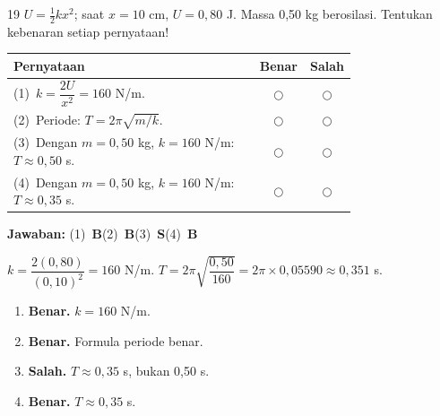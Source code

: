 \documentclass[11pt]{article}
\newcommand{\jawaban}[1]{%
  \noindent\colorbox{gold!30}{\parbox{\dimexpr\linewidth-2\fboxsep\relax}{%
    \textbf{Jawaban:} #1}}\par\smallskip}
\begin{document}
\begin{soal}{19}
$U=\tfrac12kx^2$; saat $x=10$ cm, $U=0{,}80$ J. Massa 0{,}50 kg berosilasi.
Tentukan kebenaran setiap pernyataan!

\par\smallskip
{\renewcommand{\arraystretch}{1.4}%
\begin{tabular}{@{}p{0.76\linewidth}cc@{}}
\hline\textbf{Pernyataan}&\textbf{Benar}&\textbf{Salah}\\\hline
(1)~$k=\dfrac{2U}{x^2}=160$ N/m.&$\bigcirc$&$\bigcirc$\\
(2)~Periode: $T=2\pi\sqrt{m/k}$.&$\bigcirc$&$\bigcirc$\\
(3)~Dengan $m=0{,}50$ kg, $k=160$ N/m: $T\approx0{,}50$ s.&$\bigcirc$&$\bigcirc$\\
(4)~Dengan $m=0{,}50$ kg, $k=160$ N/m: $T\approx0{,}35$ s.&$\bigcirc$&$\bigcirc$\\\hline
\end{tabular}}
\end{soal}
\begin{pembox}
\jawaban{(1)~\textbf{B}\quad(2)~\textbf{B}\quad(3)~\textbf{S}\quad(4)~\textbf{B}}
$k=\dfrac{2(0{,}80)}{(0{,}10)^2}=160$ N/m.
$T=2\pi\sqrt{\dfrac{0{,}50}{160}}=2\pi\times0{,}05590\approx0{,}351$ s.
\begin{enumerate}[leftmargin=*,topsep=2pt,itemsep=2pt]
\item \textbf{Benar.} $k=160$ N/m.
\item \textbf{Benar.} Formula periode benar.
\item \textbf{Salah.} $T\approx0{,}35$ s, bukan 0{,}50 s.
\item \textbf{Benar.} $T\approx0{,}35$ s.
\end{enumerate}
\end{pembox}
\end{document}

